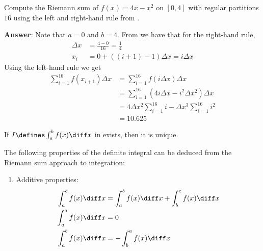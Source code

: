 \begin{exm}\label{exm-riemann-sum:3}
	Compute the Riemann sum of $f(x)=4x-x^2$ on $[0,4]$ with regular partitions
	$16$ using the left and right-hand rule from .
	\begin{flushleft}
		\textbf{Answer}: Note that $a=0$ and $b=4$. From 
		we have that for the right-hand rule,
		\begin{align*}
			\Delta x & = \frac{4-0}{16} = \frac{1}{4}      \\
			x_i      & = 0 + ((i+1)-1)\Delta x = i\Delta x
		\end{align*}
		Using the left-hand rule we get
		\begin{align*}
			\sum_{i=1}^{16} f(x_{i+1})\Delta x & = \sum_{i=1}^{16} f(i\Delta x)\Delta x                               \\
			                                   & = \sum_{i=1}^{16} \left(4 i \Delta x - i^2 \Delta x^2\right)\Delta x \\
			                                   & = 4 \Delta x^2 \sum_{i=1}^{16} i - \Delta x^3 \sum_{i=1}^{16} i^2    \\
			                                   & = 10.625
		\end{align*}
	\end{flushleft}
\end{exm}

\begin{rem}
	If $I\defines \int_a^b f(x) \diff x$ in 
	exists, then it is unique.
\end{rem}

\begin{definition}\label{def-definite-integral-properties}
	The following properties of the definite integral can be deduced from the
	Riemann sum approach to integration:
	\begin{enumerate}
		\item Additive properties:
		      \begin{align}
			      \int_a^c f(x) \diff x & = \int_a^b f(x) \diff x + \int_b^c f(x) \diff x \\
			      \int_a^a f(x) \diff x & = 0                                             \\
			      \int_a^b f(x) \diff x & = -\int_b^a f(x) \diff x
		      \end{align}
	\end{enumerate}
\end{definition}

